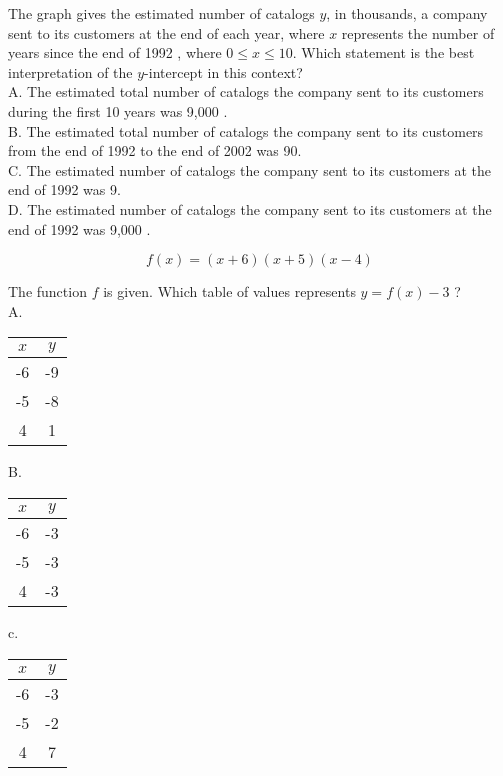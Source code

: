 The graph gives the estimated number of catalogs $y$, in thousands, a company sent to its customers at the end of each year, where $x$ represents the number of years since the end of 1992 , where $0 \leq x \leq 10$. Which statement is the best interpretation of the $y$-intercept in this context?\\
A. The estimated total number of catalogs the company sent to its customers during the first 10 years was 9,000 .\\
B. The estimated total number of catalogs the company sent to its customers from the end of 1992 to the end of 2002 was 90.\\
C. The estimated number of catalogs the company sent to its customers at the end of 1992 was 9.\\
D. The estimated number of catalogs the company sent to its customers at the end of 1992 was 9,000 .

$$
f(x)=(x+6)(x+5)(x-4)
$$

The function $f$ is given. Which table of values represents $y=f(x)-3$ ?\\
A.

\begin{center}
\begin{tabular}{|c|c|}
\hline
$x$ & $y$ \\
\hline
-6 & -9 \\
\hline
-5 & -8 \\
\hline
4 & 1 \\
\hline
\end{tabular}
\end{center}

B.

\begin{center}
\begin{tabular}{|c|c|}
\hline
$x$ & $y$ \\
\hline
-6 & -3 \\
\hline
-5 & -3 \\
\hline
4 & -3 \\
\hline
\end{tabular}
\end{center}

c.

\begin{center}
\begin{tabular}{|c|c|}
\hline
$x$ & $y$ \\
\hline
-6 & -3 \\
\hline
-5 & -2 \\
\hline
4 & 7 \\
\hline
\end{tabular}
\end{center}

